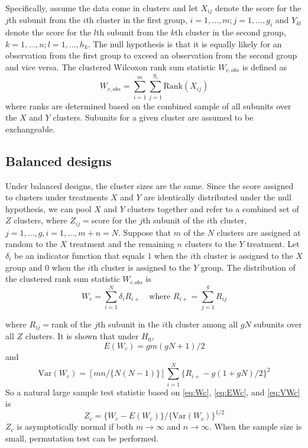 \documentclass[article]{jss}
\begin{document}
Specifically, 
assume the data come in clusters and 
let $X_{ij}$ denote the score for the $j$th subunit
from the $i$th cluster in the first group, 
$i = 1,\ldots,m; j = 1,\ldots,g_i$ and $Y_{kl}$ 
denote the score for the $l$th subunit from 
the $k$th cluster in the second group,
$k=1, \ldots,n;l=1,\ldots,h_k$.
The null hypothesis is that it is 
equally likely for an observation from the 
first group to exceed an 
observation from the second group and vice versa.
The clustered Wilcoxon rank sum statistic 
$W_{c,obs}$ is defined as 
\begin{equation} \label{eq:Wco}
W_{c,obs} = \sum_{i=1}^m\sum_{j=1}^{g_i}\text{Rank}(X_{ij})
\end{equation}
where ranks are determined based on the
combined sample of all subunits over the
$X$ and $Y$ clusters. Subunits
for a given cluster are assumed to be exchangeable.


\subsection{Balanced designs}\label{bal}
Under balanced designs, the cluster sizes are the same.
Since the score assigned to clusters under treatments
$X$ and $Y$ are
identically distributed under the null hypothesis,
we can pool $X$ and $Y$ clusters together and refer 
to a combined set of $Z$ clusters, where $Z_{ij} = $score
for the $j$th subunit of the $i$th cluster,
$j = 1,\ldots,g, i=1,\ldots,m+n = N$.
Suppose that $m$ of the $N$ clusters are assigned 
at random to the $X$ treatment and the remaining $n$
clusters to the $Y$ treatment.
Let $\delta_i$ be
an indicator function that equals $1$ when the $i$th cluster 
is assigned to the $X$ group and $0$ when the $i$th cluster
is assigned to the $Y$ group. 
The distribution of the clustered rank sum statistic $W_{c.obs}$ is
\begin{equation}\label{eq:Wc}
W_c = \sum^N_{i=1}\delta_iR_{i+} \quad \text{where   }R_{i+} = \sum^g_{j=1}R_{ij}
\end{equation}

where $R_{ij}=$rank of the $j$th subunit in the 
$i$th cluster among all $gN$ subunits over all $Z$ clusters. It is shown that under $H_0$, 
\begin{equation}\label{eq:EWc}
E(W_c) = gm(gN + 1)/2
\end{equation}
and 
\begin{equation}\label{eq:VWc}
\text{Var}(W_c) = [mn/\{N(N-1)\}]\sum^N_{i=1}\{R_{i+} - g(1+gN)/2\}^2
\end{equation}
So a natural large sample test statistic based on \eqref{eq:Wc}, \eqref{eq:EWc}, and \eqref{eq:VWc} is 
\begin{equation}
Z_c = \{W_c - E(W_c)\}/\{\text{Var}(W_c)\}^{1/2}
\end{equation}
$Z_c$ is asymptotically normal if both $m \to \infty$ and $n \to \infty$.
When the sample size is small, permutation test can be 
performed.
\end{document}
